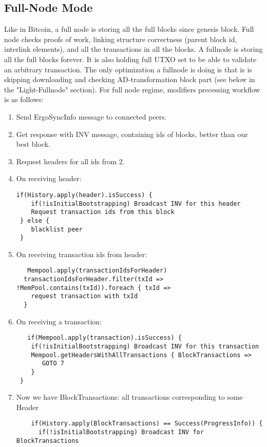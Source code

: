 \documentclass[]{report}   %
\begin{document}
\subsection{Full-Node Mode}
Like in Bitcoin, a full node is storing all the full blocks since genesis block. Full node checks proofs of work, linking structure correctness (parent block id, interlink elements), and all the transactions in all the blocks. A fullnode is storing all the full blocks forever. It is also holding full UTXO set to be able to validate an arbitrary transaction.
The only optimization a fullnode is doing is that is is skipping downloading and checking AD-transformation block part (see below in the "Light-Fullnode" section).
For full node regime, modifiers precessing workflow is as follows:
\begin{enumerate}
   \item Send ErgoSyncInfo message to connected peers.
   \item Get response with INV message, containing ids of blocks, better than our best block.
   \item Request headers for all ids from 2.
   \item On receiving header:
   \begin{verbatim}
if(History.apply(header).isSuccess) {
    if(!isInitialBootstrapping) Broadcast INV for this header   
    Request transaction ids from this block
 } else {
    blacklist peer
 }
\end{verbatim}
\hfill
\break
   \item On receiving transaction ids from header:
   \begin{verbatim}
   Mempool.apply(transactionIdsForHeader)
  transactionIdsForHeader.filter(txId => !MemPool.contains(txId)).foreach { txId => 
    request transaction with txId
  }
   \end{verbatim}
   \item On receiving a transaction:
   \begin{verbatim}
   if(Mempool.apply(transaction).isSuccess) {
    if(!isInitialBootstrapping) Broadcast INV for this transaction
    Mempool.getHeadersWithAllTransactions { BlockTransactions =>
       GOTO 7
    }
 }
   \end{verbatim}
   \item Now we have BlockTransactions: all transactions corresponding to some Header
   \begin{verbatim}
    if(History.apply(BlockTransactions) == Success(ProgressInfo)) {
      if(!isInitialBootstrapping) Broadcast INV for BlockTransactions

\end{verbatim}
\end{enumerate}
\end{document}

